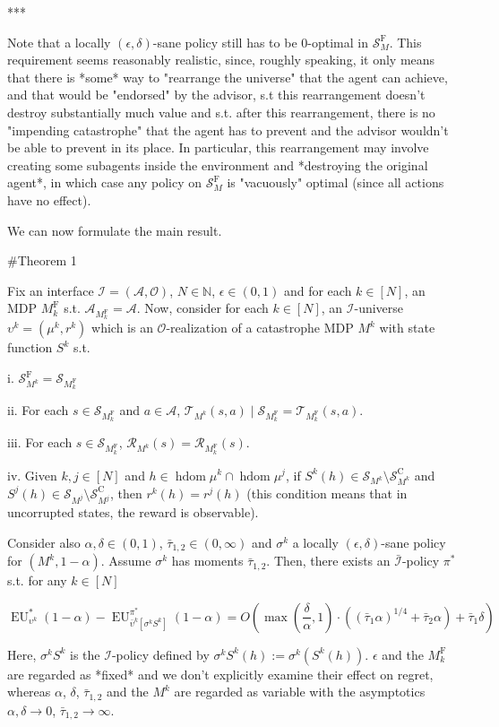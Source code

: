 \documentclass[a4paper]{article}
\newcommand{\AP}[1]{\left(#1\right)}
\newcommand{\AB}[1]{\left[#1\right]}
\newcommand{\Nats}{\mathbb{N}}
\newcommand{\Ob}{\mathcal{O}}
\newcommand{\A}{\mathcal{A}}
\newcommand{\St}{\mathcal{S}}
\newcommand{\T}{\mathcal{T}}
\newcommand{\R}{\mathcal{R}}
\newcommand{\In}{\mathcal{I}}
\newcommand{\Adi}{{\bar{\In}}}
\DeclareMathOperator{\HD}{hdom}
\newcommand{\RMC}{\mathrm{C}}
\newcommand{\RMF}{\mathrm{F}}
\newcommand{\SF}{\St^{\RMF}}
\newcommand{\SC}{\St^{\RMC}}
\newcommand{\MF}{M^{\RMF}}
\newcommand{\EU}{\operatorname{EU}}
\begin{document}
***

Note that a locally $(\epsilon,\delta)$-sane policy still has to be $0$-optimal in $\SF_M$. This requirement seems reasonably realistic, since, roughly speaking, it only means that there is *some* way to "rearrange the universe" that the agent can achieve, and that would be "endorsed" by the advisor, s.t this rearrangement doesn't destroy substantially much value and s.t. after this rearrangement, there is no "impending catastrophe" that the agent has to prevent and the advisor wouldn't be able to prevent in its place. In particular, this rearrangement may involve creating some subagents inside the environment and *destroying the original agent*, in which case any policy on $\SF_M$ is "vacuously" optimal (since all actions have no effect).

We can now formulate the main result.

\#Theorem 1

Fix an interface $\In=(\A,\Ob)$, $N \in \Nats$, $\epsilon \in (0,1)$ and for each $k \in [N]$, an MDP $\MF_k$ s.t. $\A_{\MF_k} = \A$. Now, consider for each $k \in [N]$, an $\In$-universe $\upsilon^k=(\mu^k,r^k)$ which is an $\Ob$-realization of a catastrophe MDP $M^k$ with state function $S^k$ s.t.

i. $\SF_{M^k} = \St_{\MF_k}$

ii. For each $s \in \St_{\MF_k}$ and $a \in \A$, $\T_{M^k}(s,a) \mid \St_{\MF_k} = \T_{\MF_k}(s,a)$.

iii. For each $s \in \St_{\MF_k}$, $\R_{M^k}(s)=\R_{\MF_k}(s)$.

iv. Given $k,j \in [N]$ and $h \in \HD{\mu^k} \cap \HD{\mu^j}$, if $S^k(h) \in \St_{M^k} \setminus \SC_{M^k}$ and $S^j(h) \in \St_{M^j} \setminus \SC_{M^j}$, then $r^k(h)=r^j(h)$ (this condition means that in uncorrupted states, the reward is observable).

Consider also $\alpha,\delta\in(0,1)$, $\bar{\tau}_{1,2} \in (0,\infty)$ and $\sigma^k$ a locally $(\epsilon,\delta)$-sane policy for $(M^k,1-\alpha)$. Assume $\sigma^k$ has moments $\bar{\tau}_{1,2}$. Then, there exists an $\Adi$-policy $\pi^*$ s.t. for any $k \in [N]$

$$\EU_{\upsilon^k}^*(1-\alpha) - \EU_{\bar{\upsilon}^k\AB{\sigma^kS^k}}^{\pi^*}(1-\alpha) = O\AP{\max\AP{\frac{\delta}{\alpha},1}\cdot\AP{(\bar{\tau}_1 \alpha)^{1/4} + \bar{\tau}_2 \alpha}+\bar{\tau}_1\delta}$$

Here, $\sigma^k S^k$ is the $\In$-policy defined by $\sigma^k S^k(h):=\sigma^k\AP{S^k(h)}$. $\epsilon$ and the $\MF_k$ are regarded as *fixed* and we don't explicitly examine their effect on regret, whereas $\alpha$, $\delta$, $\bar{\tau}_{1,2}$ and the $M^k$ are regarded as variable with the asymptotics $\alpha,\delta \rightarrow 0$, $\bar{\tau}_{1,2} \rightarrow \infty$.
\end{document}
